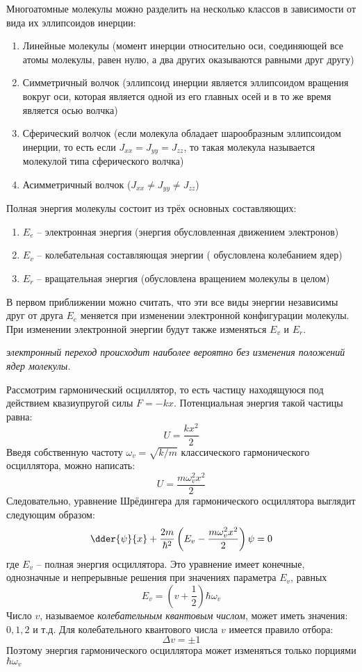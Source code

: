 Многоатомные молекулы можно разделить на несколько классов в
зависимости от вида их эллипсоидов инерции:
\begin{enumerate}
	\item Линейные молекулы (момент инерции относительно оси, 
		соединяющей все атомы молекулы, равен нулю, а два 
		других оказываются равными друг другу)
	\item Симметричный волчок (эллипсоид инерции является эллипсоидом
		вращения вокруг оси, которая является одной из его главных осей 
		и в то же время является осью волчка)
	\item Сферический волчок (если молекула обладает шарообразным
		эллипсоидом инерции, то есть если \( J_{xx} = J_{yy} = J_{zz}\), 
		то такая молекула называется молекулой типа сферического волчка)
	\item Асимметричный волчок (\( J_{xx} \neq J_{yy} \neq J_{zz} \))
\end{enumerate}

Полная энергия молекулы состоит из трёх основных составляющих:
\begin{enumerate}
	\item \( E_e \) -- электронная энергия (энергия обусловленная 
		движением электронов)
	\item \( E_v \) -- колебательная составляющая энергии (
		обусловлена колебанием ядер)
	\item \( E_r \) -- вращательная энергия (обусловлена вращением 
		молекулы в целом)
\end{enumerate}
В первом приближении можно считать, что эти все виды энергии независимы 
друг от друга \( E_e \) меняется при изменении электронной конфигурации 
молекулы. При изменении электронной энергии будут также изменяться 
\( E_v \) и  \( E_r \).

\emph{электронный переход происходит наиболее вероятно без 
изменения положений ядер молекулы.}

Рассмотрим гармонический осциллятор, то есть частицу находящуюся под 
действием квазиупругой силы \( F = -kx \). Потенциальная энергия 
такой частицы равна:
\[ U = \frac{kx^2}{2} \]
Введя собственную частоту \( \omega_v = \sqrt{k/m} \) классического 
гармонического осциллятора, можно написать:
\[ U = \frac{m\omega^2_v x^2}{2} \]
Следовательно, уравнение Шрёдингера для гармонического осциллятора 
выглядит следующим образом:
\[ 
	\dder{\psi}{x} + \frac{2m}{\hbar^2}
	\left( E_v - \frac{m\omega^2_v x^2}{2}\right)\psi = 0
\]
где \( E_v \) -- полная энергия осциллятора. Это уравнение имеет 
конечные, однозначные и непрерывные решения при значениях параметра 
\( E_v \), равных
\[ E_v = \left(v + \frac{1}{2}\right)\hbar\omega_v \]
Число \( v \), называемое \emph{колебательным квантовым числом}, 
может иметь значения: \( 0, 1, 2 \) и т.д.
Для колебательного квантового числа \( v \) имеется правило отбора:
\[ \Delta v = \pm 1 \]
Поэтому энергия гармонического осциллятора может изменяться только 
порциями \( \hbar\omega_v \)

